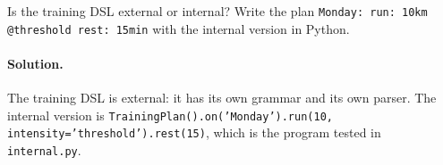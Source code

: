 \begin{exercise}
Is the training DSL external or internal? Write the plan
\texttt{Monday: run: 10km @threshold rest: 15min} with the internal version in
Python.
\end{exercise}

\paragraph{Solution.} The training DSL is external: it has its own grammar and its
own parser. The internal version is
\texttt{TrainingPlan().on('Monday').run(10, intensity='threshold').rest(15)},
which is the program tested in \texttt{internal.py}.
